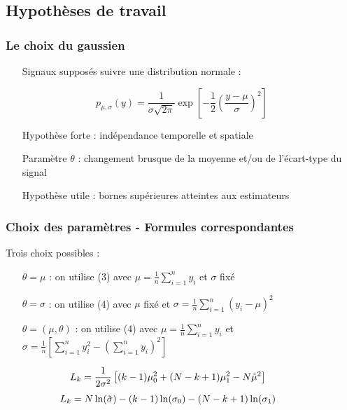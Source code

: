 \documentclass{beamer}
\begin{document}
\subsection{Hypothèses de travail}

\begin{frame}
	\frametitle{Le choix du gaussien}
	\begin{itemize}
		\item[Signaux] supposés suivre une distribution normale :
	\end{itemize}
	\begin{equation}
		p_{\mu, \sigma}(y) = \frac1{\sigma\sqrt{2 \pi}} \exp \left[ -\frac12 \left( \frac{y - \mu}{\sigma} \right)^2 \right]
	\end{equation}
	\begin{itemize}
		\item[Hypothèse] forte : indépendance temporelle et spatiale
		\item[Paramètre] $\theta$ : changement brusque de la moyenne et/ou de l'écart-type du signal
		\item[Hypothèse] utile : bornes supérieures atteintes aux estimateurs
	\end{itemize}
\end{frame}

\begin{frame}
	\frametitle{Choix des paramètres - Formules correspondantes}
	Trois choix possibles :
	\begin{itemize}
		\item[$\theta=\mu$]: on utilise (3) avec $\mu=\frac1n\sum_{i=1}^ny_i$ et $\sigma$ fixé
		\vspace*{.1cm}
		\item[$\theta=\sigma$]:  on utilise (4) avec $\mu$ fixé et $\sigma=\frac1n\sum_{i=1}^n(y_i-\mu)^2$
		\vspace*{.1cm}
		\item[$\theta=(\mu,\theta)$]: on utilise (4) avec $\mu=\frac1n\sum_{i=1}^ny_i$ et\\
		\hspace*{5.5cm}\mbox{$\sigma=\frac1n\left[\sum_{i=1}^ny_i^2-(\sum_{i=1}^ny_i)^2\right]$}
	\end{itemize}
	\vspace*{1cm}
	\begin{equation}
	\hspace{-1cm}	L_k=\frac 1{2\sigma^2}\left[(k-1)\mu_0^2+(N-k+1)\mu_1^2-N\tilde\mu^2\right]
	\end{equation}
	\begin{equation}
	\hspace{-1cm}	L_k=N\ln(\tilde\sigma)-(k-1)\ln(\sigma_0)-(N-k+1)\ln(\sigma_1)
	\end{equation}
\end{frame}
\end{document}
